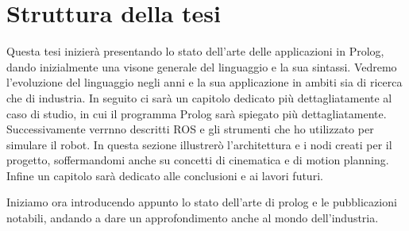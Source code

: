 \section{Struttura della tesi}
\label{sec:struttura}
Questa tesi inizierà presentando lo stato dell'arte delle applicazioni in Prolog, dando inizialmente una visone generale del linguaggio e la sua sintassi. Vedremo l'evoluzione del linguaggio negli anni e la sua applicazione in ambiti sia di ricerca che di industria.
In seguito ci sarà un capitolo dedicato più dettagliatamente al caso di studio, in cui il programma Prolog sarà spiegato più dettagliatamente. 
Successivamente verrnno descritti ROS e gli strumenti che ho utilizzato per simulare il robot. In questa sezione illustrerò l'architettura e i nodi creati per il progetto, soffermandomi anche su concetti di cinematica e di motion planning.
Infine un capitolo sarà dedicato alle conclusioni e ai lavori futuri.

Iniziamo ora introducendo appunto lo stato dell'arte di prolog e le pubblicazioni notabili, andando a dare un approfondimento anche al mondo dell'industria.

